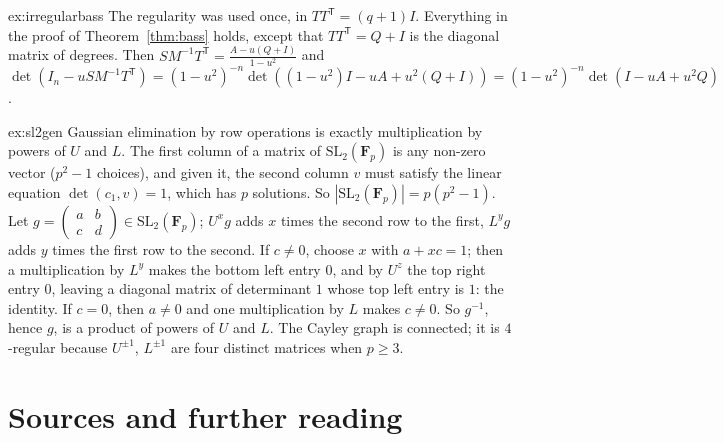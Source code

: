 \begin{solution}{ex:irregularbass}
\idea The regularity was used once, in $TT^{\mathsf T}=(q+1)I$.
\writeup Everything in the proof of Theorem~\ref{thm:bass} holds, except that $TT^{\mathsf T}=Q+I$ is the diagonal matrix of degrees. Then $SM^{-1}T^{\mathsf T}=\frac{A-u(Q+I)}{1-u^2}$ and
$\det(I_n-uSM^{-1}T^{\mathsf T})=(1-u^2)^{-n}\det((1-u^2)I-uA+u^2(Q+I))=(1-u^2)^{-n}\det(I-uA+u^2Q)$.
\end{solution}

\begin{solution}{ex:sl2gen}
\idea Gaussian elimination by row operations is exactly multiplication by powers of $U$ and $L$.
\writeup The first column of a matrix of $\mathrm{SL}_2(\mathbf F_p)$ is any non-zero vector ($p^2-1$ choices), and given it, the second column $v$ must satisfy the linear equation $\det(c_1,v)=1$, which has $p$ solutions. So
$|\mathrm{SL}_2(\mathbf F_p)|=p(p^2-1)$. Let $g=(\begin{smallmatrix}a&b\\c&d\end{smallmatrix})\in\mathrm{SL}_2(\mathbf F_p)$; $U^xg$ adds $x$ times the second row to the first, $L^yg$ adds $y$ times the first row to the second. If $c\ne0$, choose $x$ with
$a+xc=1$; then a multiplication by $L^y$ makes the bottom left entry $0$, and by $U^z$ the top right entry $0$, leaving a diagonal matrix of determinant $1$ whose top left entry is $1$: the identity. If $c=0$, then $a\ne0$
and one multiplication by $L$ makes $c\ne0$. So $g^{-1}$, hence $g$, is a product of powers of $U$ and $L$. The Cayley graph is connected; it is $4$-regular because $U^{\pm1}$, $L^{\pm1}$ are four distinct matrices when $p\ge3$.
\end{solution}

\section*{Sources and further reading}

